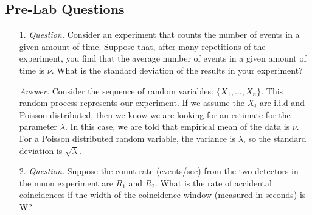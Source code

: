 \subsection{Pre-Lab Questions}
\begin{itemize}
        \item[1.] \textit{Question.} Consider an experiment that counts the number of events in a given amount of time. Suppose that, after many repetitions of the experiment, you find that the average number of events in a given amount of time is $\nu$. What is the standard deviation of the results in your experiment?
        
        \textit{Answer.} Consider the sequence of random variables: $\{X_1,\ldots,X_n\}$. This random process represents our experiment. If we assume the $X_i$ are i.i.d and Poisson distributed, then we know we are looking for an estimate for the parameter $\lambda$. In this case, we are told that empirical mean of the data is $\nu$. For a Poisson distributed random variable, the variance is $\lambda$, so the standard deviation is $\sqrt{\lambda}$. 
        \item[2.] \textit{Question.} Suppose the count rate (events/sec) from the two detectors in the muon experiment are $R_1$ and $R_2$. What is the rate of accidental coincidences if the width of the coincidence window (measured in seconds) is W?
        

\end{itemize}
